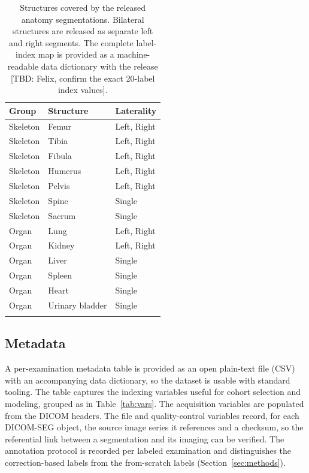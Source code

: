 \begin{table}[h]
\caption{Structures covered by the released anatomy segmentations. Bilateral structures are released as separate left and right segments. The complete label-index map is provided as a machine-readable data dictionary with the release [TBD: Felix, confirm the exact 20-label index values].}\label{tab:labels}
\begin{tabular}{@{}lll@{}}
\toprule
Group & Structure & Laterality \\
\midrule
Skeleton & Femur          & Left, Right \\
Skeleton & Tibia          & Left, Right \\
Skeleton & Fibula         & Left, Right \\
Skeleton & Humerus        & Left, Right \\
Skeleton & Pelvis         & Left, Right \\
Skeleton & Spine          & Single \\
Skeleton & Sacrum         & Single \\
Organ    & Lung           & Left, Right \\
Organ    & Kidney         & Left, Right \\
Organ    & Liver          & Single \\
Organ    & Spleen         & Single \\
Organ    & Heart          & Single \\
Organ    & Urinary bladder & Single \\
\botrule
\end{tabular}
\end{table}

\subsection*{Metadata}\label{subsec:metadata}
A per-examination metadata table is provided as an open plain-text file (CSV) with an accompanying data dictionary, so the dataset is usable with standard tooling.
The table captures the indexing variables useful for cohort selection and modeling, grouped as in Table~\ref{tab:vars}.
The acquisition variables are populated from the DICOM headers.
The file and quality-control variables record, for each DICOM-SEG object, the source image series it references and a checksum, so the referential link between a segmentation and its imaging can be verified.
The annotation protocol is recorded per labeled examination and distinguishes the correction-based labels from the from-scratch labels (Section~\ref{sec:methods}).

